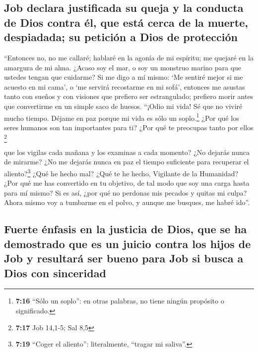 \hypertarget{job-declara-justificada-su-queja-y-la-conducta-de-dios-contra-uxe9l-que-estuxe1-cerca-de-la-muerte-despiadada-su-peticiuxf3n-a-dios-de-protecciuxf3n}{%
\subsection{Job declara justificada su queja y la conducta de Dios
contra él, que está cerca de la muerte, despiadada; su petición a Dios
de
protección}\label{job-declara-justificada-su-queja-y-la-conducta-de-dios-contra-uxe9l-que-estuxe1-cerca-de-la-muerte-despiadada-su-peticiuxf3n-a-dios-de-protecciuxf3n}}

 ``Entonces no, no me callaré; hablaré en la agonía de mi
espíritu; me quejaré en la amargura de mi alma.  ¿Acaso
soy el mar, o soy un monstruo marino para que ustedes tengan que
cuidarme?  Si me digo a mí mismo: `Me sentiré mejor si me
acuesto en mi cama', o `me servirá recostarme en mi sofá',
 entonces me asustas tanto con sueños y con visiones
 que prefiero ser estrangulado; prefiero morir antes que
convertirme en un simple saco de huesos.  ``¡Odio mi
vida! Sé que no viviré mucho tiempo. Déjame en paz porque mi vida es
sólo un soplo.\footnote{\textbf{7:16} ``Sólo un soplo'': en otras
  palabras, no tiene ningún propósito o significado.} 
¿Por qué los seres humanos son tan importantes para ti? ¿Por qué te
preocupas tanto por ellos \footnote{\textbf{7:17} Job 14,1-5; Sal 8,5}

 que los vigilas cada mañana y los examinas a cada
momento? ¿No dejarás nunca de mirarme?  ¿No me dejarás
nunca en paz el tiempo suficiente para recuperar el aliento?\footnote{\textbf{7:19}
  ``Coger el aliento'': literalmente, ``tragar mi saliva''.}
 ¿Qué he hecho mal? ¿Qué te he hecho, Vigilante de la
Humanidad? ¿Por qué me has convertido en tu objetivo, de tal modo que
soy una carga hasta para mí mismo?  Si es así, ¿por qué
no perdonas mis pecados y quitas mi culpa? Ahora mismo voy a tumbarme en
el polvo, y aunque me busques, me habré ido''.

\hypertarget{fuerte-uxe9nfasis-en-la-justicia-de-dios-que-se-ha-demostrado-que-es-un-juicio-contra-los-hijos-de-job-y-resultaruxe1-ser-bueno-para-job-si-busca-a-dios-con-sinceridad}{%
\subsection{Fuerte énfasis en la justicia de Dios, que se ha demostrado
que es un juicio contra los hijos de Job y resultará ser bueno para Job
si busca a Dios con
sinceridad}\label{fuerte-uxe9nfasis-en-la-justicia-de-dios-que-se-ha-demostrado-que-es-un-juicio-contra-los-hijos-de-job-y-resultaruxe1-ser-bueno-para-job-si-busca-a-dios-con-sinceridad}}

